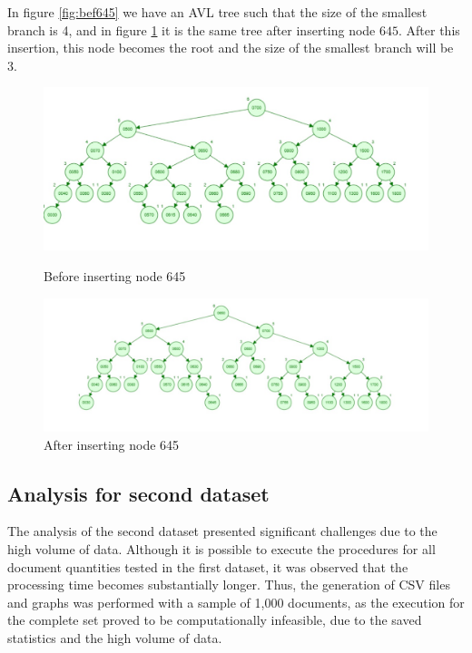  In figure \ref{fig:bef645} we have an AVL tree such that the size of the smallest branch is 4, and in figure
 \ref{fig:af645} it is the same tree after inserting node $645$. After this insertion,
 this node becomes the root and the size of the smallest branch will be 3.

 \begin{figure}[H]
     \centering
     \begin{minipage}{0.46\linewidth}
         \centering
         \includegraphics[width=\linewidth]{img/avl_before.jpeg}
         \caption{Before inserting node 645}
         \label{fig:bef645}
     \end{minipage}
     \hfill
     \begin{minipage}{0.48\linewidth}
         \centering
         \includegraphics[width=\linewidth]{img/avl_after.jpeg}
         \caption{After inserting node 645}
         \label{fig:af645}
     \end{minipage}
 \end{figure}

 \subsection{Analysis for second dataset}

 The analysis of the second dataset presented significant challenges due to the high volume of data.
 Although it is possible to execute the procedures for all document quantities tested in the first dataset,
 it was observed that the processing time becomes substantially longer.
 Thus, the generation of CSV files and graphs was performed with a sample of 1,000 documents,
 as the execution for the complete set proved to be computationally infeasible, due to the saved statistics and the
 high volume of data.


